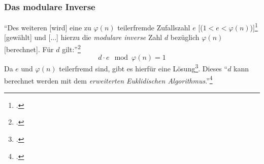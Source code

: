 \documentclass{scrarticle} %
\begin{document}
        \subsubsection{Das modulare Inverse} %
            \enquote{Des weiteren [wird] eine zu $\varphi(n)$ teilerfremde Zufallszahl $e$ [($1<e<\varphi(n)$)]\footcite[71]{watjen2008} [gewählt] und [...] hierzu die \emph{modulare inverse} Zahl $d$ bezüglich $\varphi(n)$ [berechnet]. Für $d$ gilt:}\footcite[279]{beutelspacher2015}
            \begin{equation}
                d\cdot e\mod{\varphi(n)} = 1 \label{eq:modinv}
            \end{equation}
            Da $e$ und $\varphi(n)$ teilerfremd sind, gibt es hierfür eine Lösung\footcite[Vgl.][77, 164]{ertel2003}. Dieses
            \enquote{$d$ kann berechnet werden mit dem \emph{erweiterten Euklidischen Algorithmus}.}\footcite[77]{ertel2003}
\end{document}
